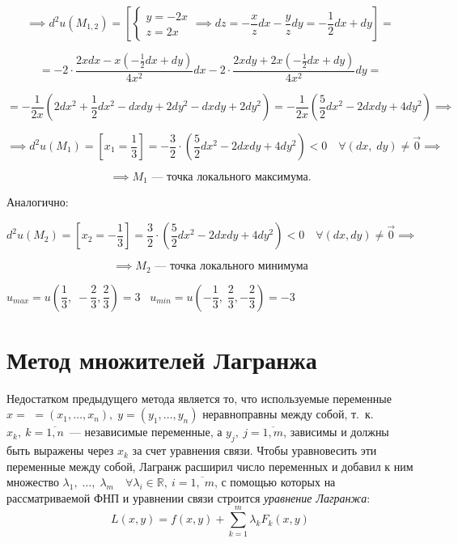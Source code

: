 \documentclass[../../main.tex]{subfiles}
\begin{document}
\begin{example}
	\[\implies d^2u\left(M_{1, 2}\right) = \left[
	\begin{cases}
	y = -2x\\
	z = 2x 
	\end{cases} \implies dz = -\dfrac{x}{z}dx - \dfrac{y}{z}dy = 
	-\dfrac{1}{2}dx + dy 
	\right] =\]
	
	\[= -2 \cdot \frac{2xdx - x\left(-\frac{1}{2}dx + dy\right)}{4x^2}dx - 
	2 \cdot \frac{2xdy + 2x \left(-\frac{1}{2}dx + dy\right)}{4x^2}dy =\]
	
	\[= -\dfrac{1}{2x}\left(2dx^2 + \dfrac{1}{2}dx^2 - dxdy + 2dy^2 - 
	dxdy + 2dy^2 \right) = -\dfrac{1}{2x} \left( \dfrac{5}
	{2} dx^2 - 2dxdy + 4dy^2 \right) \implies\]
	
	\[\implies d^2u\left(M_1\right) = \left[x_1 = \dfrac{1}{3}\right] = 
	-\dfrac{3}{2}\cdot\left(\dfrac{5}{2}dx^2 - 2dxdy + 
	4dy^2\right) < 0 \quad 
	\forall \left(dx, \; dy\right) \neq \vec{0} \implies\]
	
	\[\implies M_1 \text{~--- точка локального максимума}.\]
	
	Аналогично:
	
	\[d^2u \left(M_2\right) = \left[x_2 = -\dfrac{1}{3} \right] = 
	\dfrac{3}{2} \cdot \left( \dfrac{5}{2} dx^2 - 2dxdy + 4dy^2\right) < 0 
	\quad \forall \left(dx, dy\right) \neq \vec{0} \implies\]
	
	\[ \implies M_2 
	\text{~--- точка локального минимума}\]
	
	$u_{max} = u\left(\dfrac{1}{3}, \; -\dfrac{2}{3}, 
	\dfrac{2}{3}\right) = 3 \;\;\; 
	u_{min} = u\left(-\dfrac{1}{3}, \; 
	\dfrac{2}{3}, -\dfrac{2}{3}\right) = -3$ 
\end{example}

	\section{Метод множителей Лагранжа} 
	
	Недостатком предыдущего метода является то, что используемые переменные 
	$x = $ $=\left(x_1, \ldots, x_n\right), \; y = \left(y_1,\ldots, y_n\right)$
	неравноправны между собой, т.~к. $x_k,\ k = \overline{1, n}$~--- 
	независимые переменные, а $y_j,\ j = \overline{1, m}$, зависимы и 
	должны быть выражены через $x_k$ за счет уравнения связи. 
	Чтобы уравновесить эти переменные между собой, Лагранж расширил 
	число переменных и добавил к ним множество 
	$\lambda_1,\; \ldots,\; \lambda_m\quad \forall 
	\lambda_i \in \mathbb{R},\ i = \overline{1,\; m}$, 
	с помощью которых на рассматриваемой ФНП и уравнении 
	связи строится \emph{уравнение Лагранжа}:
	\begin{equation}
	L\left(x, y\right) = f\left(x, y\right) + \sum\limits_{k = 1}^m 
	\lambda_k F_k\left(x, y\right) \label{lec11.1:8}
	\end{equation}
	
\end{document}
